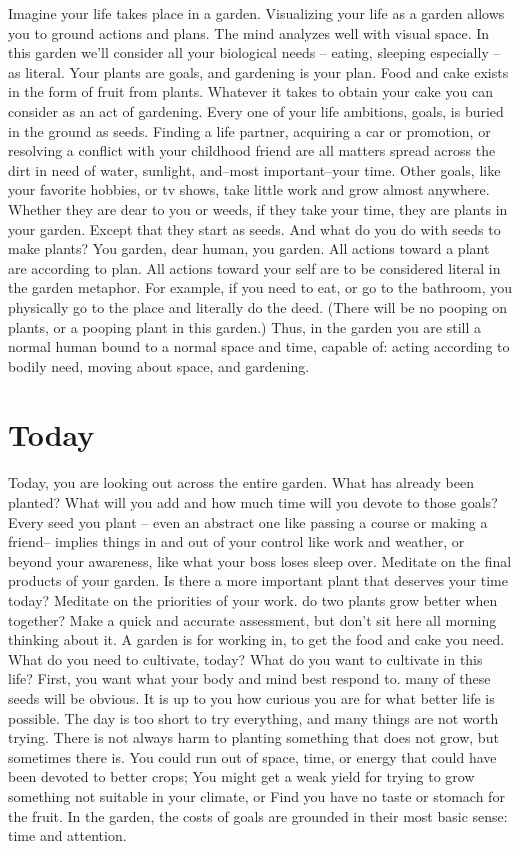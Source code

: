 \documentclass[
]{book}
\begin{document}
Imagine your life takes place in a garden.
Visualizing your life as a garden allows you to ground actions and plans.
The mind analyzes well with visual space.
In this garden we'll consider all your biological needs -- eating, sleeping especially -- as literal.
Your plants are goals, and gardening is your plan.
Food and cake exists in the form of fruit from plants.
Whatever it takes to obtain your cake you can consider as an act of gardening.
Every one of your life ambitions, goals, is buried in the ground as seeds.
Finding a life partner, acquiring a car or promotion, or resolving a conflict with your childhood friend are all matters spread across the dirt in need of water, sunlight, and--most important--your time.
Other goals, like your favorite hobbies, or tv shows, take little work and grow almost anywhere.
Whether they are dear to you or weeds, if they take your time, they are plants in your garden.
Except that they start as seeds.
And what do you do with seeds to make plants? You garden, dear human, you garden.
All actions toward a plant are according to plan.
All actions toward your self are to be considered literal in the garden metaphor.
For example, if you need to eat, or go to the bathroom, you physically go to the place and literally do the deed.
(There will be no pooping on plants, or a pooping plant in this garden.)
Thus, in the garden you are still a normal human bound to a normal space and time, capable of: acting according to bodily need, moving about space, and gardening.

\hypertarget{today}{%
\section{Today}\label{today}}

Today, you are looking out across the entire garden.
What has already been planted? What will you add and how much time will you devote to those goals?
Every seed you plant -- even an abstract one like passing a course or making a friend-- implies things in and out of your control like work and weather, or beyond your awareness, like what your boss loses sleep over.
Meditate on the final products of your garden.
Is there a more important plant that deserves your time today?
Meditate on the priorities of your work. do two plants grow better when together?
Make a quick and accurate assessment, but don't sit here all morning thinking about it.
A garden is for working in, to get the food and cake you need.
What do you need to cultivate, today?
What do you want to cultivate in this life?
First, you want what your body and mind best respond to. many of these seeds will be obvious.
It is up to you how curious you are for what better life is possible.
The day is too short to try everything, and many things are not worth trying.
There is not always harm to planting something that does not grow, but sometimes there is.
You could run out of space, time, or energy that could have been devoted to better crops;
You might get a weak yield for trying to grow something not suitable in your climate, or
Find you have no taste or stomach for the fruit.
In the garden, the costs of goals are grounded in their most basic sense: time and attention.
\end{document}
